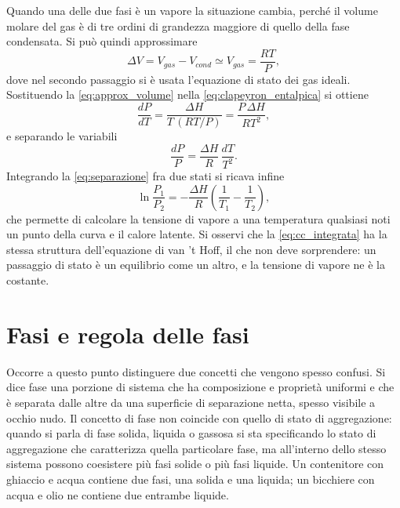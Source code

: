 Quando una delle due fasi è un vapore la situazione cambia, perché il volume molare del gas è di tre ordini di grandezza maggiore di quello della fase condensata.
Si può quindi approssimare
\begin{equation}
    \Delta V = V_{gas} - V_{cond} \simeq V_{gas} = \frac{RT}{P} ,
    \label{eq:approx_volume}
\end{equation}
dove nel secondo passaggio si è usata l'equazione di stato dei gas ideali.
Sostituendo la \eqref{eq:approx_volume} nella \eqref{eq:clapeyron_entalpica} si ottiene
\begin{equation}
    \frac{dP}{dT} = \frac{\Delta H}{T\,(RT/P)} = \frac{P\,\Delta H}{RT^2} ,
    \label{eq:cc_vapore}
\end{equation}
e separando le variabili
\begin{equation}
    \frac{dP}{P} = \frac{\Delta H}{R}\,\frac{dT}{T^2} .
    \label{eq:separazione}
\end{equation}
Integrando la \eqref{eq:separazione} fra due stati si ricava infine
\begin{equation}
    \ln\frac{P_1}{P_2} = -\frac{\Delta H}{R}\left(\frac{1}{T_1} - \frac{1}{T_2}\right) ,
    \label{eq:cc_integrata}
\end{equation}
che permette di calcolare la tensione di vapore a una temperatura qualsiasi noti un punto della curva e il calore latente.
Si osservi che la \eqref{eq:cc_integrata} ha la stessa struttura dell'equazione di van 't Hoff, il che non deve sorprendere: un passaggio di stato è un equilibrio come un altro, e la tensione di vapore ne è la costante.
 
\section{Fasi e regola delle fasi}
 
Occorre a questo punto distinguere due concetti che vengono spesso confusi.
Si dice fase una porzione di sistema che ha composizione e proprietà uniformi e che è separata dalle altre da una superficie di separazione netta, spesso visibile a occhio nudo.
Il concetto di fase non coincide con quello di stato di aggregazione: quando si parla di fase solida, liquida o gassosa si sta specificando lo stato di aggregazione che caratterizza quella particolare fase, ma all'interno dello stesso sistema possono coesistere più fasi solide o più fasi liquide.
Un contenitore con ghiaccio e acqua contiene due fasi, una solida e una liquida; un bicchiere con acqua e olio ne contiene due entrambe liquide.
 
